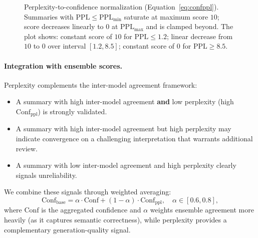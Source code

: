 \begin{figure}[!h]
\centering
{}

\caption{Perplexity-to-confidence normalization (Equation~\eqref{eq:confppl}). Summaries with
$\mathrm{PPL} \le \mathrm{PPL}_{\min}$ saturate at maximum score $10$; score decreases
linearly to $0$ at $\mathrm{PPL}_{\max}$ and is clamped beyond. The plot shows: constant
score of $10$ for $\mathrm{PPL} \le 1.2$; linear decrease from $10$ to $0$ over interval
$[1.2, 8.5]$; constant score of $0$ for $\mathrm{PPL} \ge 8.5$.}
\label{fig:ppl-norm}
\end{figure}

\paragraph{Integration with ensemble scores.}
Perplexity complements the inter-model agreement framework:
\begin{itemize}
  \item A summary with high inter-model agreement \textbf{and} low perplexity (high
        $\mathrm{Conf}_{\mathrm{ppl}}$) is strongly validated.
  \item A summary with high inter-model agreement but high perplexity may indicate
        convergence on a challenging interpretation that warrants additional review.
  \item A summary with low inter-model agreement and high perplexity clearly signals
        unreliability.
\end{itemize}
We combine these signals through weighted averaging:
\begin{equation}
\mathrm{Conf}_{\mathrm{base}} = \alpha \cdot \mathrm{Conf} + (1-\alpha) \cdot
\mathrm{Conf}_{\mathrm{ppl}}, \quad \alpha \in [0.6, 0.8],
\label{eq:confbase}
\end{equation}
where $\mathrm{Conf}$ is the aggregated confidence and
$\alpha$ weights ensemble agreement more heavily (as it captures semantic correctness),
while perplexity provides a complementary generation-quality signal.

